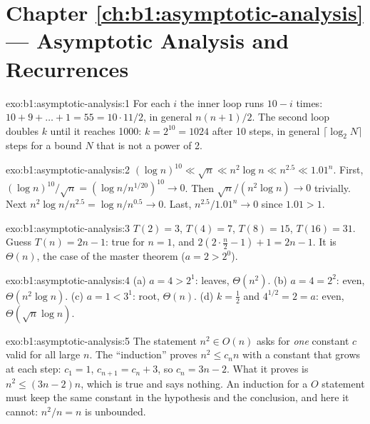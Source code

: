 \section*{Chapter \ref{ch:b1:asymptotic-analysis} --- Asymptotic Analysis and Recurrences}

\begin{solution}{exo:b1:asymptotic-analysis:1}
For each $i$ the inner loop runs $10 - i$ times: $10 + 9 + \dots + 1 = 55 = 10 \cdot 11/2$, in general $n(n + 1)/2$.
The second loop doubles $k$ until it reaches 1000: $k = 2^{10} = 1024$ after 10 steps, in general $\lceil \log_2 N
\rceil$ steps for a bound $N$ that is not a power of 2.
\end{solution}

\begin{solution}{exo:b1:asymptotic-analysis:2}
$(\log n)^{10} \ll \sqrt{n} \ll n^2 \log n \ll n^{2.5} \ll 1.01^n$. First, $(\log n)^{10}/\sqrt{n} = (\log n /
n^{1/20})^{10} \to 0$. Then $\sqrt{n}/(n^2 \log n) \to 0$ trivially. Next $n^2 \log n / n^{2.5} = \log n / n^{0.5} \to
0$. Last, $n^{2.5}/1.01^n \to 0$ since $1.01 > 1$.
\end{solution}

\begin{solution}{exo:b1:asymptotic-analysis:3}
$T(2) = 3$, $T(4) = 7$, $T(8) = 15$, $T(16) = 31$. Guess $T(n) = 2n - 1$: true for $n = 1$, and $2(2 \cdot \frac n2 - 1) + 1
= 2n - 1$. It is $\Theta(n)$, the  case of the master theorem ($a = 2 > 2^0$).
\end{solution}

\begin{solution}{exo:b1:asymptotic-analysis:4}
(a) $a = 4 > 2^1$: leaves, $\Theta(n^2)$. (b) $a = 4 = 2^2$: even, $\Theta(n^2 \log n)$. (c) $a = 1 < 3^1$: root,
$\Theta(n)$. (d) $k = \frac12$ and $4^{1/2} = 2 = a$: even, $\Theta(\sqrt{n} \log n)$.
\end{solution}

\begin{solution}{exo:b1:asymptotic-analysis:5}
The statement $n^2 \in O(n)$ asks for \emph{one} constant $c$ valid for all large $n$. The ``induction'' proves $n^2 \leq
c_n n$ with a constant that grows at each step: $c_1 = 1$, $c_{n + 1} = c_n + 3$, so $c_n = 3n - 2$. What it proves is
$n^2 \leq (3n - 2)n$, which is true and says nothing. An induction for a $O$ statement must keep the same constant in
the hypothesis and the conclusion, and here it cannot: $n^2/n = n$ is unbounded.
\end{solution}

